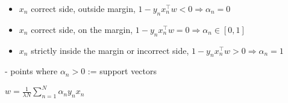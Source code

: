 \begin{itemize}
  \item $x_{n}$ correct side, outside margin, $1-y_{n} x_{n}^{\top} w<0 \Rightarrow\alpha_{n}=0$
  \item $x_{n}$ correct side, on the margin, $1-y_{n} x_{n}^{\top} w=0\Rightarrow\alpha_{n} \in[0,1]$
  \item $x_{n}$ strictly inside the margin or incorrect side, $1-y_{n} x_{n}^{\top} w>0\Rightarrow\alpha_{n}=1$
\end{itemize}

- points where $\alpha_{n}>0$ := support vectors


$
w=\frac{1}{\lambda N} \sum_{n=1}^{N} \alpha_{n} y_{n} x_{n}
$









